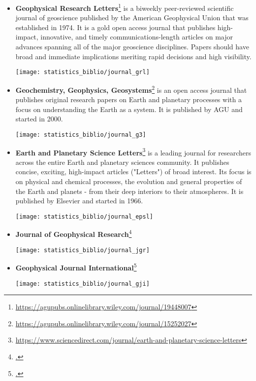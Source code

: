 \begin{itemize}
\item {\bf Geophysical Research Letters}\footnote{\url{https://agupubs.onlinelibrary.wiley.com/journal/19448007}} 
is a biweekly peer-reviewed scientific journal of 
geoscience published by the American Geophysical Union that was established in 1974.
It is a gold open access journal that publishes high-impact, innovative, and timely 
communications-length articles on major advances spanning all of the major geoscience disciplines. 
Papers should have broad and immediate implications meriting rapid decisions and high visibility.

\begin{center}
\texttt{[image: statistics\_biblio/journal\_grl]}
\end{center}

\item 
{\bf Geochemistry, Geophysics, Geosystems}\footnote{\url{https://agupubs.onlinelibrary.wiley.com/journal/15252027}} 
is an open access journal that publishes original research papers on Earth and planetary 
processes with a focus on understanding the Earth as a system.
It is published by AGU and started in 2000.

\begin{center}
\texttt{[image: statistics\_biblio/journal\_g3]}
\end{center}

\item {\bf Earth and Planetary Science Letters}\footnote{\url{https://www.sciencedirect.com/journal/earth-and-planetary-science-letters}} is a leading journal for researchers across the entire Earth 
and planetary sciences community. It publishes concise, exciting, high-impact articles 
("Letters") of broad interest. Its focus is on physical and chemical processes, the 
evolution and general properties of the Earth and planets - from their deep interiors to their atmospheres. 
It is published by Elsevier and started in 1966.

\begin{center}
\texttt{[image: statistics\_biblio/journal\_epsl]}
\end{center}

\item {\bf Journal of Geophysical Research}\footnote{\url{.}}
\begin{center}
\texttt{[image: statistics\_biblio/journal\_jgr]}
\end{center}

\item {\bf Geophysical Journal International}\footnote{\url{.}}
\begin{center}
\texttt{[image: statistics\_biblio/journal\_gji]}
\end{center}



\end{itemize}
